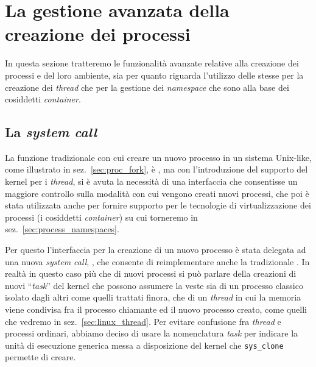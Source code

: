 


\section{La gestione avanzata della creazione dei processi}
\label{sec:process_adv_creation}

In questa sezione tratteremo le funzionalità avanzate relative alla creazione
dei processi e del loro ambiente, sia per quanto riguarda l'utilizzo delle
stesse per la creazione dei \textit{thread} che per la gestione dei
\textit{namespace} che sono alla base dei cosiddetti \textit{container}.


\subsection{La \textit{system call} }
\label{sec:process_clone}

La funzione tradizionale con cui creare un nuovo processo in un sistema
Unix-like, come illustrato in sez.~\ref{sec:proc_fork}, è , ma con
l'introduzione del supporto del kernel per i \textit{thread}, si è avuta la necessità di una interfaccia che
consentisse un maggiore controllo sulla modalità con cui vengono creati nuovi
processi, che poi è stata utilizzata anche per fornire supporto per le
tecnologie di virtualizzazione dei processi (i cosiddetti \textit{container})
su cui torneremo in sez.~\ref{sec:process_namespaces}.

Per questo l'interfaccia per la creazione di un nuovo processo è stata
delegata ad una nuova \textit{system call}, , che consente
di reimplementare anche la tradizionale . In realtà in questo caso
più che di nuovi processi si può parlare della creazioni di nuovi
``\textit{task}'' del kernel che possono assumere la veste sia di un processo
classico isolato dagli altri come quelli trattati finora, che di un
\textit{thread} in cui la memoria viene condivisa fra il processo chiamante ed
il nuovo processo creato, come quelli che vedremo in
sez.~\ref{sec:linux_thread}. Per evitare confusione fra \textit{thread} e
processi ordinari, abbiamo deciso di usare la nomenclatura \textit{task} per
indicare la unità di esecuzione generica messa a disposizione del kernel che
\texttt{sys\_clone} permette di creare.

